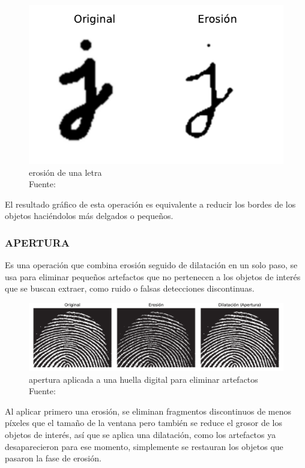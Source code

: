 				\begin{figure}[H]
					\centering
					\includegraphics[scale=0.7]{imagenes/erosion}
					\caption[Erosión de una letra]{erosión de una letra\\Fuente: \citep{szeliski}}
				\end{figure}
				
				El resultado gráfico de esta operación es equivalente a reducir los bordes de los objetos haciéndolos más delgados o pequeños.
			\subsubsection{APERTURA}
				Es una operación que combina erosión seguido de dilatación en un solo paso, se usa para eliminar pequeños artefactos que no pertenecen a los objetos de interés que se buscan extraer, como ruido o falsas detecciones discontinuas.
				
				\begin{figure}[H]
					\centering
					\includegraphics[scale=0.6]{imagenes/apertura}
					\caption[Apertura aplicada a una huella digital]{apertura aplicada a una huella digital para eliminar artefactos\\Fuente: \citep{gonzalez}}
				\end{figure}
				
				Al aplicar primero una erosión, se eliminan fragmentos discontinuos de menos píxeles que el tamaño de la ventana pero también se reduce el grosor de los objetos de interés, así que se aplica una dilatación, como los artefactos ya desaparecieron para ese momento, simplemente se restauran los objetos que pasaron la fase de erosión.
